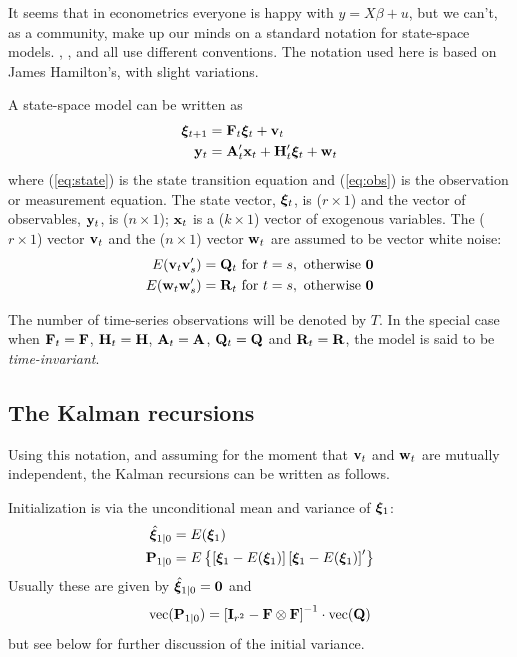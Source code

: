 It seems that in econometrics everyone is happy with $y = X \beta +
u$, but we can't, as a community, make up our minds on a standard
notation for state-space models. \cite{harvey89}, \cite{hamilton94},
\cite{harvey-proietti05} and \cite{pollock99} all use different
conventions. The notation used here is based on James Hamilton's, with
slight variations.

A state-space model can be written as
%
\begin{align}
  \label{eq:state}
  \bm{\xi}_{t+1} &=  \mathbf{F}_t \bm{\xi}_t + \mathbf{v}_t \\
  \label{eq:obs}
  \mathbf{y}_t &= \mathbf{A}_t'\mathbf{x}_t + \mathbf{H}_t' \bm{\xi}_t +
  \mathbf{w}_t 
\end{align}
%
where (\ref{eq:state}) is the state transition equation and
(\ref{eq:obs}) is the observation or measurement equation.  The state
vector, $\bm{\xi}_{t}$, is ($r \times 1$) and the vector of
observables, $\mathbf{y}_t$, is ($n \times 1$); $\mathbf{x}_t$ is a ($k
\times 1$) vector of exogenous variables.  The ($r \times 1$) vector
$\mathbf{v}_t$ and the ($n \times 1$) vector $\mathbf{w}_t$ are assumed to
be vector white noise:
%
\begin{align*}
E(\mathbf{v}_t \mathbf{v}_s') &= \mathbf{Q}_t \mbox{ for } t = s, 
    \mbox{ otherwise } \mathbf{0} \\
E(\mathbf{w}_t \mathbf{w}_s') &= \mathbf{R}_t \mbox{ for } t = s, 
    \mbox{ otherwise } \mathbf{0}
\end{align*}

The number of time-series observations will be denoted by $T$.
In the special case when $\mathbf{F}_t = \mathbf{F}$, $\mathbf{H}_t = \mathbf{H}$,
$\mathbf{A}_t = \mathbf{A}$, $\mathbf{Q}_t = \mathbf{Q}$ and $\mathbf{R}_t =
\mathbf{R}$, the model is said to be \emph{time-invariant}.

\subsection{The Kalman recursions}
\label{sec:kalman-recursions}

Using this notation, and assuming for the moment that $\mathbf{v}_t$ and
$\mathbf{w}_t$ are mutually independent, the Kalman recursions can be
written as follows.

Initialization is via the unconditional mean and variance of
$\bm{\xi}_1$:
%
\begin{align*}
\hat{\bm{\xi}}_{1|0} &= E(\bm{\xi}_1) \\
\mathbf{P}_{1|0} &= E\left\{\left[\bm{\xi}_1 - E(\bm{\xi}_1)\right]
   \left[\bm{\xi}_1 - E(\bm{\xi}_1)\right]' \right\}
\end{align*}
%
Usually these are given by $\hat{\bm{\xi}}_{1|0} = \mathbf{0}$ and
%
\begin{equation}
\label{eq:inivar}
\mbox{vec}(\mathbf{P}_{1|0}) = \left[\mathbf{I}_{r^2} - \mathbf{F} \otimes
  \mathbf{F}\right]^{-1} \cdot \mbox{vec}(\mathbf{Q})
\end{equation}
but see below for further discussion of the initial variance.

